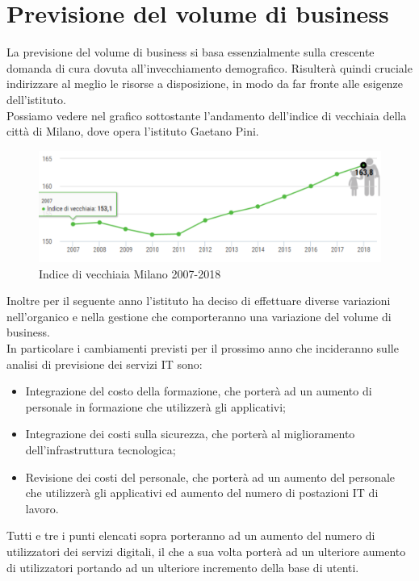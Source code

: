 \newpage
\section{Previsione del volume di business} \label{ref:previsione}
La previsione del volume di business si basa essenzialmente sulla crescente domanda di cura dovuta all’invecchiamento demografico. Risulterà quindi cruciale indirizzare al meglio le risorse a disposizione, in modo da far fronte alle esigenze dell'istituto.\\
Possiamo vedere nel grafico sottostante l'andamento dell'indice di vecchiaia della città di Milano, dove opera l'istituto Gaetano Pini.
\begin{figure}[h!]
	\centering
	\includegraphics[width=\linewidth]{./img/vecchiaia.jpg}
	\caption{Indice di vecchiaia Milano 2007-2018}\label{fig:vecchiaia}
\end{figure}

Inoltre per il seguente anno l'istituto ha deciso di effettuare diverse variazioni nell'organico e nella gestione che comporteranno una variazione del volume di business. \\
In particolare i cambiamenti previsti per il prossimo anno che incideranno sulle analisi di previsione dei servizi IT sono:
\begin{itemize}
	\item Integrazione del costo della formazione, che porterà ad un aumento di personale in formazione che utilizzerà gli applicativi;
	\item Integrazione dei costi sulla sicurezza, che porterà al miglioramento dell'infrastruttura tecnologica;
	\item Revisione dei costi del personale, che porterà ad un aumento del personale che utilizzerà gli applicativi ed aumento del numero di postazioni IT di lavoro.
\end{itemize}

Tutti e tre i punti elencati sopra porteranno ad un aumento del numero di utilizzatori dei servizi digitali, il che a sua volta porterà ad un ulteriore aumento di utilizzatori portando ad un ulteriore incremento della base di utenti.